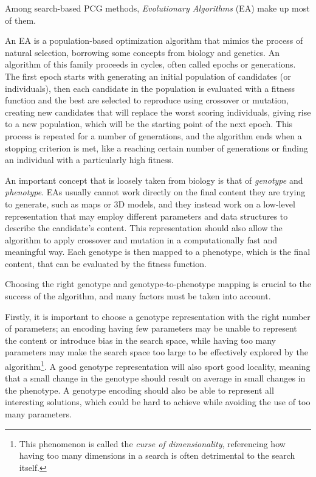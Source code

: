 Among search-based PCG methods, \textit{Evolutionary Algorithms} (EA) make up most of them. \cite{togelius_search-based_2010}

An EA is a population-based optimization algorithm that mimics the process of natural selection, borrowing some concepts from biology and genetics. An algorithm of this family proceeds in cycles, often called epochs or generations. The first epoch starts with generating an initial population of candidates (or individuals), then each candidate in the population is evaluated with a fitness function and the best are selected to reproduce using crossover or mutation, creating new candidates that will replace the worst scoring individuals, giving rise to a new population, which will be the starting point of the next epoch. This process is repeated for a number of generations, and the algorithm ends when a stopping criterion is met, like a reaching certain number of generations or finding an individual with a particularly high fitness. \cite{lones_sean_2011}

An important concept that is loosely taken from biology is that of \textit{genotype} and \textit{phenotype}. EAs usually cannot work directly on the final content they are trying to generate, such as maps or 3D models, and they instead work on a low-level representation that may employ different parameters and data structures to describe the candidate's content. This representation should also allow the algorithm to apply crossover and mutation in a computationally fast and meaningful way. Each genotype is then mapped to a phenotype, which is the final content, that can be evaluated by the fitness function. \cite{togelius_search-based_2010}

Choosing the right genotype and genotype-to-phenotype mapping is crucial to the success of the algorithm, and many factors must be taken into account. 

Firstly, it is important to choose a genotype representation with the right number of parameters; an encoding having few parameters may be unable to represent the content or introduce bias in the search space, while having too many parameters may make the search space too large to be effectively explored by the algorithm\footnote{This phenomenon is called the \textit{curse of dimensionality}, referencing how having too many dimensions in a search is often detrimental to the search itself.}.
A good genotype representation will also sport good locality, meaning that a small change in the genotype should result on average in small changes in the phenotype.
A genotype encoding should also be able to represent all interesting solutions, which could be hard to achieve while avoiding the use of too many parameters. \cite{togelius_search-based_2010}

